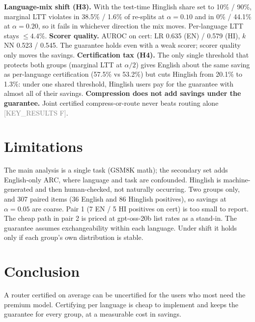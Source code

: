 \documentclass[11pt]{article}
\newcommand{\src}[1]{\textcolor{gray}{\footnotesize[#1]}}
\begin{document}
\textbf{Language-mix shift (H3).} With the test-time Hinglish share set to 10\% / 90\%,
marginal LTT violates in 38.5\% / 1.6\% of re-splits at $\alpha=0.10$ and in 0\% / 44.1\% at
$\alpha=0.20$, so it fails in whichever direction the mix moves. Per-language LTT stays
$\le 4.4\%$. \textbf{Scorer quality.} AUROC on cert: LR 0.635 (EN) / 0.579 (HI), $k$NN
0.523 / 0.545. The guarantee holds even with a weak scorer; scorer quality only moves the
savings. \textbf{Certification tax (H4).} The only single threshold that protects both
groups (marginal LTT at $\alpha/2$) gives English about the same saving as per-language
certification (57.5\% vs 53.2\%) but cuts Hinglish from 20.1\% to 1.3\%: under one shared
threshold, Hinglish users pay for the guarantee with almost all of their savings.
\textbf{Compression does not add savings under the guarantee.} Joint certified
compress-or-route never beats routing alone \src{KEY\_RESULTS F}.

\section{Limitations}
The main analysis is a single task (GSM8K math); the secondary set adds English-only ARC,
where language and task are confounded. Hinglish is machine-generated and then
human-checked, not naturally occurring. Two groups only, and 307 paired items (36 English
and 86 Hinglish positives), so savings at $\alpha=0.05$ are coarse.
Pair 1 (7 EN / 5 HI positives on cert) is too small to report. The cheap path in pair 2 is priced at
gpt-oss-20b list rates as a stand-in. The guarantee assumes exchangeability within each
language. Under shift it holds only if each group's own distribution is stable.

\section{Conclusion}
A router certified on average can be uncertified for the users who most need the premium
model. Certifying per language is cheap to implement and keeps the guarantee for every
group, at a measurable cost in savings.



\end{document}
